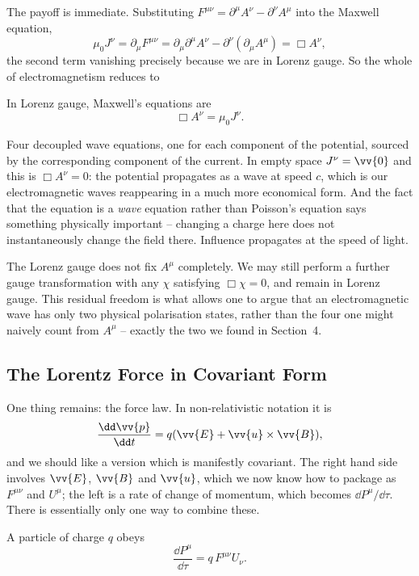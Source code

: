 The payoff is immediate. Substituting $F^{\mu\nu} = \partial^\mu A^\nu - \partial^\nu A^\mu$ into the Maxwell equation,
$$
\mu_0 J^\nu = \partial_\mu F^{\mu\nu} = \partial_\mu \partial^\mu A^\nu - \partial^\nu(\partial_\mu A^\mu) = \Box A^\nu,
$$
the second term vanishing precisely because we are in Lorenz gauge. So the whole of electromagnetism reduces to

\begin{theorem}
	In Lorenz gauge, Maxwell's equations are
	$$
	\Box A^\nu = \mu_0 J^\nu.
	$$
\end{theorem}

Four decoupled wave equations, one for each component of the potential, sourced by the corresponding component of the current. In empty space $J^\nu = \vv{0}$ and this is $\Box A^\nu = 0$: the potential propagates as a wave at speed $c$, which is our electromagnetic waves reappearing in a much more economical form. And the fact that the equation is a \emph{wave} equation rather than Poisson's equation says something physically important -- changing a charge here does not instantaneously change the field there. Influence propagates at the speed of light.

\begin{remark}
	The Lorenz gauge does not fix $A^\mu$ completely. We may still perform a further gauge transformation with any $\chi$ satisfying $\Box \chi = 0$, and remain in Lorenz gauge. This residual freedom is what allows one to argue that an electromagnetic wave has only two physical polarisation states, rather than the four one might naively count from $A^\mu$ -- exactly the two we found in Section~4.
\end{remark}

\subsection{The Lorentz Force in Covariant Form}

One thing remains: the force law. In non-relativistic notation it is
$$
\frac{\dd \vv{p}}{\dd t} = q(\vv{E}+\vv{u}\times\vv{B}),
$$
and we should like a version which is manifestly covariant. The right hand side involves $\vv{E}$, $\vv{B}$ and $\vv{u}$, which we now know how to package as $F^{\mu\nu}$ and $U^\mu$; the left is a rate of change of momentum, which becomes $\dd P^\mu/\dd\tau$. There is essentially only one way to combine these.

\begin{law}
	A particle of charge $q$ obeys
	$$
	\frac{\dd P^\mu}{\dd \tau} = q\, F^{\mu\nu}U_\nu.
	$$
\end{law}

